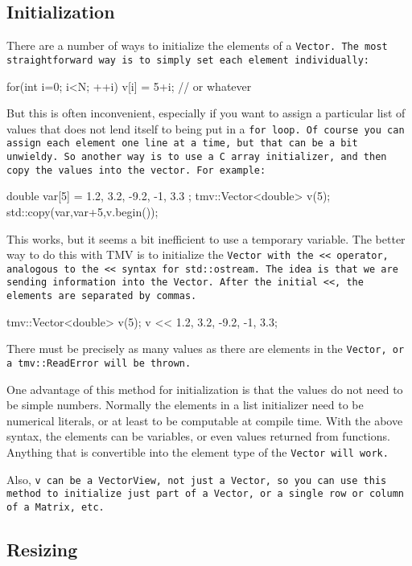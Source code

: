 \subsection{Initialization}
\label{Vector_Initialization}

There are a number of ways to initialize the elements of a \tt{Vector}.
The most straightforward way is to simply set each element individually:
\begin{tmvcode}
for(int i=0; i<N; ++i) {
    v[i] = 5+i; // or whatever
}
\end{tmvcode}
But this is often inconvenient, especially if you want to assign a particular list of 
values that does not lend itself to being put in a \tt{for} loop.  Of course you can assign
each element one line at a time, but that can be a bit unwieldy.  So another 
way is to use a C array initializer, and then copy the values into the vector.  For example:
\begin{tmvcode}
double var[5] = { 1.2, 3.2, -9.2, -1, 3.3 };
tmv::Vector<double> v(5);
std::copy(var,var+5,v.begin());
\end{tmvcode}
This works, but it seems a bit inefficient to use a temporary variable.
The better way to do this with TMV is to initialize the \tt{Vector} with the \tt{<<} operator, analogous to the \tt{<<} syntax for \tt{std::ostream}.
The idea is that we are sending information into the \tt{Vector}.  
After the initial \tt{<<}, the elements are separated by commas.
\begin{tmvcode}
tmv::Vector<double> v(5);
v << 1.2, 3.2, -9.2, -1, 3.3;
\end{tmvcode}
There must be precisely as many values as there are elements in the \tt{Vector},
or a \tt{tmv::ReadError} will be thrown.

One advantage of this method for initialization is that the values do not need to be simple numbers.
Normally the elements in a list initializer need to be numerical literals, or at least to be 
computable at compile time.
With the above syntax, the elements can be variables, 
or even values returned from functions.  Anything that is convertible
into the element type of the \tt{Vector} will work.

Also, \tt{v} can be a \tt{VectorView}, not just a \tt{Vector}, so you can use this method to 
initialize just part of a \tt{Vector}, or a single row or column of a \tt{Matrix}, etc.

\subsection{Resizing}
\label{Vector_Resize}


